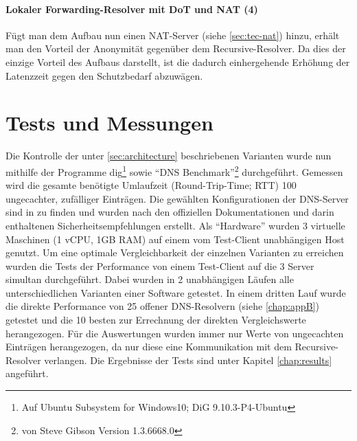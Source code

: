 \paragraph{Lokaler Forwarding-Resolver mit DoT und NAT (4)}
Fügt man dem Aufbau nun einen NAT-Server (siehe \ref{sec:tec-nat}) hinzu, erhält man den Vorteil der Anonymität gegenüber dem Recursive-Resolver. Da dies der einzige Vorteil des Aufbaus darstellt, ist die dadurch einhergehende Erhöhung der Latenzzeit gegen den Schutzbedarf abzuwägen.

\section{Tests und Messungen}
\label{sec:measurements}
Die Kontrolle der unter \ref{sec:architecture} beschriebenen Varianten wurde nun mithilfe der Programme dig\footnote{Auf Ubuntu Subsystem for Windows10; DiG 9.10.3-P4-Ubuntu} sowie ``DNS Benchmark''\footnote{von Steve Gibson Version 1.3.6668.0} durchgeführt. Gemessen wird die gesamte benötigte Umlaufzeit (Round-Trip-Time; RTT) 100 ungecachter, zufälliger Einträgen. Die gewählten Konfigurationen der DNS-Server sind in  zu finden und wurden nach den offiziellen Dokumentationen und darin enthaltenen Sicherheitsempfehlungen erstellt. Als ``Hardware'' wurden 3 virtuelle Maschinen (1 vCPU, 1GB RAM) auf einem vom Test-Client unabhängigen Host genutzt. Um eine optimale Vergleichbarkeit der einzelnen Varianten zu erreichen wurden die Tests der Performance von einem Test-Client auf die 3 Server simultan durchgeführt. Dabei wurden in 2 unabhängigen Läufen alle unterschiedlichen Varianten einer Software getestet. In einem dritten Lauf wurde die direkte Performance von 25 offener DNS-Resolvern (siehe \ref{chap:appB}) getestet und die 10 besten zur Errechnung der direkten Vergleichswerte herangezogen. Für die Auswertungen wurden immer nur Werte von ungecachten Einträgen herangezogen, da nur diese eine Kommunikation mit dem Recursive-Resolver verlangen. Die Ergebnisse der Tests sind unter Kapitel \ref{chap:results} angeführt. 

